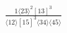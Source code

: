 \documentclass[varwidth, border=5pt]{standalone}
\begin{document}
\begin{my}
$\begin{gathered}
\scriptscriptstyle\frac{1⟨23⟩^2[13]^3}{⟨12⟩[15]^3⟨34⟩⟨45⟩}
\end{gathered}$
\end{my}
\end{document}
